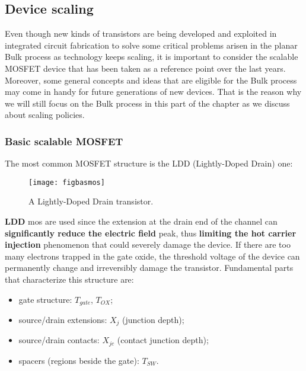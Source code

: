\documentclass[a4paper, 12pt, twoside, openright]{report}
\begin{document}
\subsection{Device scaling}

Even though new kinds of transistors are being developed and exploited in integrated circuit fabrication to solve some critical problems arisen in the planar Bulk process as technology keeps scaling, it is important to consider the scalable MOSFET device that has been taken as a reference point over the last years. Moreover, some general concepts and ideas that are eligible for the Bulk process may come in handy for future generations of new devices. That is the reason why we will still focus on the Bulk process in this part of the chapter as we discuss about scaling policies. 

\subsubsection{Basic scalable MOSFET}

The most common MOSFET structure is the LDD (Lightly-Doped Drain) one:

	\begin{figure}[h]
	\centering
	\texttt{[image: figbasmos]}
	\caption{A Lightly-Doped Drain transistor.}
	\label{}
	\end{figure}

\textbf{LDD} mos are used since the extension at the drain end of the channel can \textbf{significantly reduce the electric field} peak, thus \textbf{limiting the hot carrier injection} phenomenon that could severely damage the device. If there are too many electrons trapped in the gate oxide, the threshold voltage of the device can permanently change and irreversibly damage the transistor.
Fundamental parts that characterize this structure are:


\begin{itemize}
\item gate structure: $T_{gate}$, $T_{OX}$;
\item source/drain extensions: $X_{j}$ (junction depth);
\item source/drain contacts: $X_{jc}$ (contact junction depth);
\item spacers (regions beside the gate): $T_{SW}$.
\end{itemize}
\end{document}
